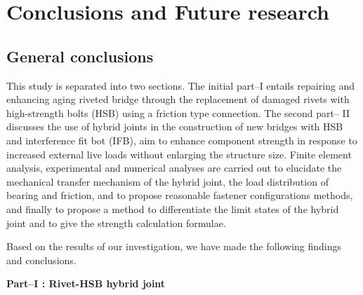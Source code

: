 \chapter{Conclusions and Future research}
\label{ch8}

\begin{spacing}{1.25} %
\minitoc %
\end{spacing} %
\onehalfspacing %

\section{General conclusions}

This study is separated into two sections. The initial part--\RN{1} entails repairing and enhancing aging riveted bridge through the replacement of damaged rivets with high-strength bolts (HSB) using a friction type connection. The second part-- \RN{2} discusses the use of hybrid joints in the construction of new bridges with HSB and interference fit bot (IFB), aim to enhance component strength in response to increased external live loads without enlarging the structure size. Finite element analysis, experimental and numerical analyses are carried out to elucidate the mechanical transfer mechanism of the hybrid joint, the load distribution of bearing and friction, and to propose reasonable fastener configurations methods, and finally to propose a method to differentiate the limit states of the hybrid joint and to give the strength calculation formulae.

Based on the results of our investigation, we have made the following findings and conclusions. \par

\textbf{Part--\RN{1} : Rivet-HSB hybrid joint}

